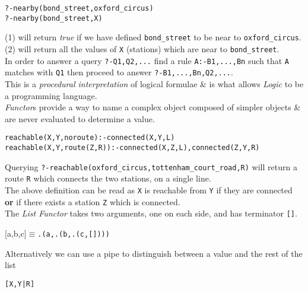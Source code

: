 \documentclass[11pt,a4paper]{article}
\begin{document}
\begin{lstlisting}
?-nearby(bond_street,oxford_circus)
?-nearby(bond_street,X)
\end{lstlisting}
(1) will return \textit{true} if we have defined \lstinline!bond_street! to be near to \lstinline!oxford_circus!.\\
(2) will return all the values of \lstinline!X! (\ie stations) which are near to \lstinline!bond_street!.\\

In order to answer a query \lstinline!?-Q1,Q2,...! find a rule \lstinline!A:-B1,...,Bn! such that \lstinline!A! matches with \lstinline!Q1! then proceed to answer \lstinline!?-B1,...,Bn,Q2,...!.\\
This is a \textit{procedural interpretation} of logical formulae \& is what allows \textit{Logic} to be a programming language.\\

\textit{Functor}s provide a way to name a complex object composed of simpler objects \& are never evaluated to determine a value.
\begin{lstlisting}
reachable(X,Y,noroute):-connected(X,Y,L)
reachable(X,Y,route(Z,R)):-connected(X,Z,L),connected(Z,Y,R)
\end{lstlisting}
Querying \lstinline!?-reachable(oxford_circus,tottenham_court_road,R)! will return a route \lstinline!R! which connects the two stations, on a single line.\\
The above definition can be read as \lstinline!X! is reachable from \lstinline!Y! if they are connected \textbf{or} if there exists a station \lstinline!Z! which is connected.\\

The \textit{List Functor} takes two arguments, one on each side, and has terminator \lstinline![]!.
\begin{center}
[a,b,c]$\equiv$\lstinline!.(a,.(b,.(c,[])))!
\end{center}
Alternatively we can use a pipe to distinguish between a value and the rest of the list
\begin{center}
\lstinline![X,Y|R]!
\end{center}
\end{document}
